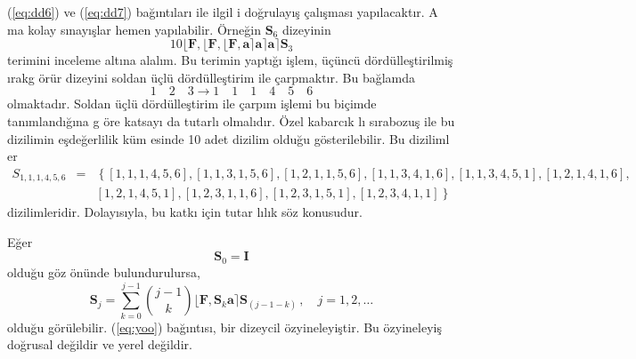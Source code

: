 \documentclass[a4paper,10pt]{article}
\begin{document}
(\ref{eq:dd6}) ve (\ref{eq:dd7}) ba\u{g}\i nt\i lar{\i} ile ilgil%
i do\u{g}rulay\i \c{s} \c{c}al\i \c{s}mas{\i} yap\i lacakt\i r. A%
ma kolay s\i nay\i \c{s}lar hemen yap\i labilir. \"Or\-ne\u{g}in %
$\mathbf{S}_{6}$ dizeyinin %
\begin{equation}
10  \lfloor \mathbf{F} ,  \lfloor \mathbf{F} , \lfloor \mathbf{F} 
 , \mathbf{a} \rceil \mathbf{a} \rceil \mathbf{a} \rceil 
 \mathbf{S}_{3}                                                                     
\end{equation}
terimini inceleme alt\i na alal\i m. Bu terimin yapt\i \u{g}{\i} %
i\c{s}lem, \"u\c{c}\"unc\"u d\"ord\"ulle\c{s}tirilmi\c{s} \i rakg%
\"or\"ur dizeyini soldan \"u\c{c}l\"u d\"ord\"ulle\c{s}tirim ile %
\c{c}arpmakt\i r. Bu ba\u{g}lamda %
\begin{equation}
  1\quad 2\quad 3 \rightarrow 1\quad 1\quad 1\quad 4\quad 5\quad 6
\end{equation}
olmaktad\i r. Soldan \"u\c{c}l\"u d\"ord\"ulle\c{s}\-ti\-rim ile %
\c{c}arp\i m i\c{s}lemi bu bi\c{c}imde tan\i mland\i \u{g}\i na g%
\"ore katsay{\i} da tutarl{\i} olmal\i d\i r. \"O\-zel kabarc\i k%
l{\i} s\i rabozu\c{s} ile bu dizilimin e\c{s}de\u{g}erlilik k\"um%
esinde 10 adet dizilim oldu\u{g}u g\"osterilebilir. Bu di\-ziliml%
er %
\begin{eqnarray}
 S_{1,1,1,4,5,6} &=& \left\{[1,1,1,4,5,6],[1,1,3,1,5,6],%
[1,2,1,1,5,6],[1,1,3,4,1,6],[1,1,3,4,5,1],%
[1,2,1,4,1,6],\right.\nonumber\\
 &&\left.[1,2,1,4,5,1],[1,2,3,1,1,6],%
[1,2,3,1,5,1],[1,2,3,4,1,1]\right\}
\end{eqnarray}
dizilimleridir. Dolay\i s\i yla, bu kat\-k{\i} i\-\c{c}in tu\-tar%
l{\i}l\i k s\"oz konusudur. %

E\u{g}er 
\begin{equation}
 \mathbf{S}_{0} = \mathbf{I}
\end{equation}
oldu\u{g}u g\"oz \"on\"unde bulundurulursa, 
\begin{equation}
 \mathbf{S}_{j} = \sum_{k=0}^{j-1} 
 {j-1 \choose k}  \lfloor \mathbf{F} , 
 \mathbf{S}_{k}\mathbf{a} \rceil
 \mathbf{S}_{(j-1-k)} \, ,  
\quad j=1,2,\ldots
\label{eq:yoo}
\end{equation}
oldu\u{g}u g\"or\"ulebilir. (\ref{eq:yoo}) ba\u{g}\i nt\i s{\i},
bir dizeycil \"ozyineleyi\c{s}tir.
Bu \"ozyineleyi\c{s} do\u{g}rusal
de\u{g}ildir ve yerel de\u{g}ildir. 
\end{document}

